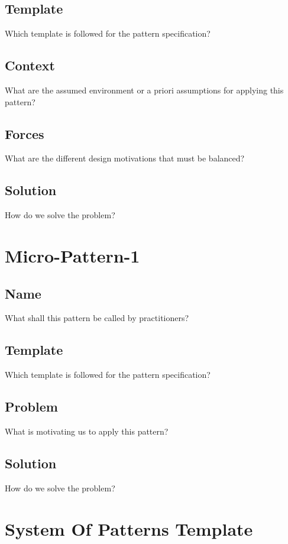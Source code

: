 \documentclass{article}
\begin{document}
\subsection{Template}
Which template is followed for the pattern specification?

\subsection{Context}
What are the assumed environment or a priori assumptions for applying this pattern?

\subsection{Forces}
What are the different design motivations that must be balanced?

\subsection{Solution}
How do we solve the problem?


\section{Micro-Pattern-1}

\subsection{Name}
What shall this pattern be called by practitioners?

\subsection{Template}
Which template is followed for the pattern specification?

\subsection{Problem}
What is motivating us to apply this pattern?

\subsection{Solution}
How do we solve the problem?


\section{System Of Patterns Template}
\end{document}
